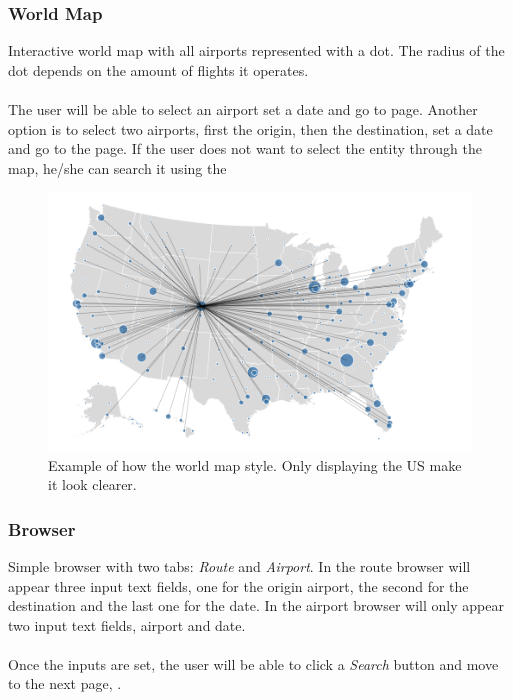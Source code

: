 \subsubsection*{World Map}

Interactive world map with all airports represented with a dot. The radius of the dot depends on the amount of flights it operates.
\\\\
The user will be able to select an airport set a date and go to  page. Another option is to select two airports, first the origin, then the destination, set a date and go to the  page. If the user does not want to select the entity through the map, he/she can search it using the 

\begin{figure}[H]
\centering
\includegraphics[scale=0.25]{resources/us-map-example01.png}
\caption{Example of how the world map style. Only displaying the US make it look clearer.}
\end{figure}

\subsubsection*{Browser} \label{browser}

Simple browser with two tabs: \textit{Route} and \textit{Airport}. In the route browser will appear three input text fields, one for the origin airport, the second for the destination and the last one for the date. In the airport browser will only appear two input text fields, airport and date.
\\\\
Once the inputs are set, the user will be able to click a \textit{Search} button and move to the next page, .

